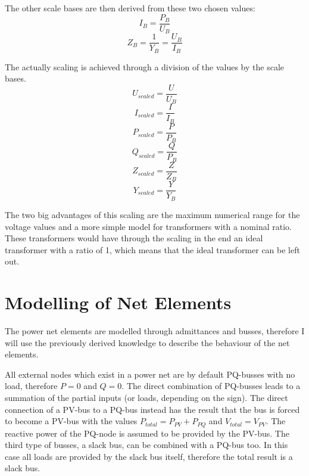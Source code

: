 The other scale bases are then derived from these two chosen values:
\begin{equation}
	I_B = \frac{P_B}{U_B}
\end{equation}
\begin{equation}
	Z_B = \frac{1}{Y_B} = \frac{U_B}{I_B}
\end{equation}

The actually scaling is achieved through a division of the values by the scale bases.
\begin{equation}
	U_{scaled} = \frac{U}{U_B}
\end{equation}
\begin{equation}
	I_{scaled} = \frac{I}{I_B}
\end{equation}
\begin{equation}
	P_{scaled} = \frac{P}{P_B}
\end{equation}
\begin{equation}
	Q_{scaled} = \frac{Q}{P_B}
\end{equation}
\begin{equation}
	Z_{scaled} = \frac{Z}{Z_B}
\end{equation}
\begin{equation}
	Y_{scaled} = \frac{Y}{Y_B}
	\label{eq:scaling_admittance}
\end{equation}

The two big advantages of this scaling are the maximum numerical range for the voltage values and a more simple model for transformers with a nominal ratio. These transformers would have through the scaling in the end an ideal transformer with a ratio of 1, which means that the ideal transformer can be left out.

\section{Modelling of Net Elements}
\label{sec:modelling}

The power net elements are modelled through admittances and busses, therefore I will use the previously derived knowledge to describe the behaviour of the net elements.

All external nodes which exist in a power net are by default PQ-busses with no load, therefore $P = 0$ and $Q = 0$. The direct combination of PQ-busses leads to a summation of the partial inputs (or loads, depending on the sign). The direct connection of a PV-bus to a PQ-bus instead has the result that the bus is forced to become a PV-bus with the values $P_{total} = P_{PV} + P_{PQ}$ and $V_{total} = V_{PV}$. The reactive power of the PQ-node is assumed to be provided by the PV-bus. The third type of busses, a slack bus, can be combined with a PQ-bus too. In this case all loads are provided by the slack bus itself, therefore the total result is a slack bus.

